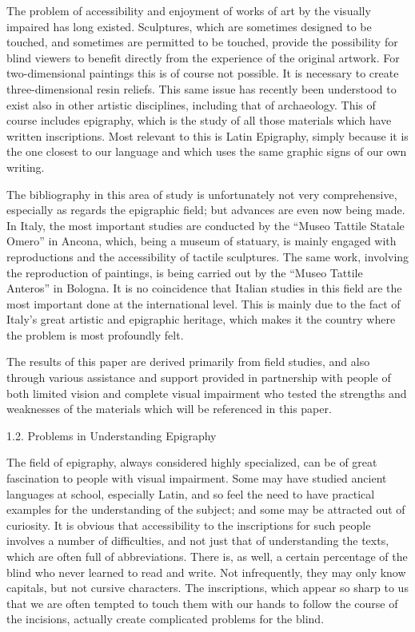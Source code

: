 \documentclass[amsthm,ebook]{saparticle}
\begin{document}
The problem of accessibility and enjoyment of works of art by the visually impaired has long existed. Sculptures, which
are sometimes designed to be touched, and sometimes are permitted to be touched, provide the possibility for blind
viewers to benefit directly from the experience of the original artwork. For two-dimensional paintings this is of
course not possible. It is necessary to create three-dimensional resin reliefs. This same issue has recently been
understood to exist also in other artistic disciplines, including that of archaeology. This of course includes
epigraphy, which is the study of all those materials which have written inscriptions. Most relevant to this is Latin
Epigraphy, simply because it is the one closest to our language and which uses the same graphic signs of our own
writing.

The bibliography in this area of study is unfortunately not very comprehensive, especially as regards the epigraphic
field; but advances are even now being made. In Italy, the most important studies are conducted by the “Museo Tattile
Statale Omero” in Ancona, which, being a museum of statuary, is mainly engaged with reproductions and the accessibility
of tactile sculptures. The same work, involving the reproduction of paintings, is being carried out by the “Museo
Tattile Anteros” in Bologna. It is no coincidence that Italian studies in this field are the most important done at the
international level. This is mainly due to the fact of Italy’s great artistic and epigraphic heritage, which makes it
the country where the problem is most profoundly felt.

The results of this paper are derived primarily from field studies, and also through various assistance and support
provided in partnership with people of both limited vision and complete visual impairment who tested the strengths and
weaknesses of the materials which will be referenced in this paper.


\bigskip


\bigskip

1.2. Problems in Understanding Epigraphy


\bigskip

The field of epigraphy, always considered highly specialized, can be of great fascination to people with visual
impairment. Some may have studied ancient languages at school, especially Latin, and so feel the need to have practical
examples for the understanding of the subject; and some may be attracted out of curiosity. It is obvious that
accessibility to the inscriptions for such people involves a number of difficulties, and not just that of understanding
the texts, which are often full of abbreviations. There is, as well, a certain percentage of the blind who never
learned to read and write. Not infrequently, they may only know capitals, but not cursive characters. The inscriptions,
which appear so sharp to us that we are often tempted to touch them with our hands to follow the course of the
incisions, actually create complicated problems for the blind.
\end{document}
